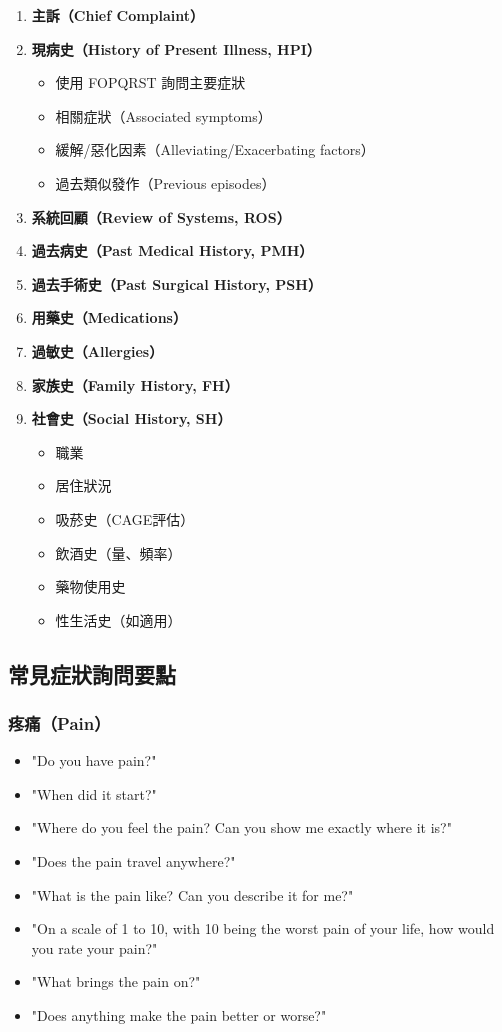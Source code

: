 \documentclass[12pt,a4paper]{article}
\begin{document}
\begin{enumerate}
    \item \textbf{主訴（Chief Complaint）}
    \item \textbf{現病史（History of Present Illness, HPI）}
    \begin{itemize}
        \item 使用 FOPQRST 詢問主要症狀
        \item 相關症狀（Associated symptoms）
        \item 緩解/惡化因素（Alleviating/Exacerbating factors）
        \item 過去類似發作（Previous episodes）
    \end{itemize}
    \item \textbf{系統回顧（Review of Systems, ROS）}
    \item \textbf{過去病史（Past Medical History, PMH）}
    \item \textbf{過去手術史（Past Surgical History, PSH）}
    \item \textbf{用藥史（Medications）}
    \item \textbf{過敏史（Allergies）}
    \item \textbf{家族史（Family History, FH）}
    \item \textbf{社會史（Social History, SH）}
    \begin{itemize}
        \item 職業
        \item 居住狀況
        \item 吸菸史（CAGE評估）
        \item 飲酒史（量、頻率）
        \item 藥物使用史
        \item 性生活史（如適用）
    \end{itemize}
\end{enumerate}

\subsection{常見症狀詢問要點}

\subsubsection{疼痛（Pain）}

\begin{itemize}
    \item "Do you have pain?"
    \item "When did it start?"
    \item "Where do you feel the pain? Can you show me exactly where it is?"
    \item "Does the pain travel anywhere?"
    \item "What is the pain like? Can you describe it for me?"
    \item "On a scale of 1 to 10, with 10 being the worst pain of your life, how would you rate your pain?"
    \item "What brings the pain on?"
    \item "Does anything make the pain better or worse?"
\end{itemize}
\end{document}
